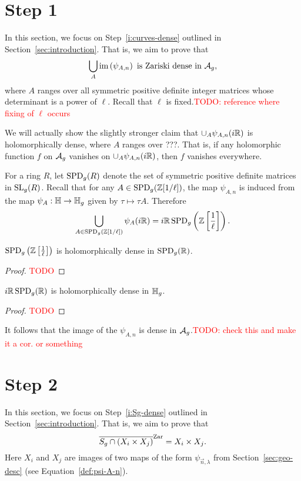 \documentclass{amsart}
\begin{document}
\newpage

\section{Step 1}
\label{sec:step-1}

In this section, we focus on Step~\ref{i:curves-dense} outlined in Section~\ref{sec:introduction}. That is, we aim to prove that
\[
  \bigcup_{A} \operatorname{im}\left(\psi_{A,n}\right) \text{ is Zariski dense in } \mathcal{A}_g,
\]
where $A$ ranges over all symmetric positive definite integer matrices whose determinant is a power of $\ell$. Recall that $\ell$ is fixed.\textcolor{red}{TODO: reference where fixing of $\ell$ occurs}

We will actually show the slightly stronger claim that $\cup_{A} \psi_{A,n}(i\mathbb{R})$ is holomorphically dense, where $A$ ranges over ???. That is, if any holomorphic function $f$ on $\mathcal{A}_g$ vanishes on $\cup_{A} \psi_{A,n}(i\mathbb{R})$, then $f$ vanishes everywhere.

For a ring $R$, let $\operatorname{SPD}_g(R)$ denote the set of symmetric positive definite matrices in $\operatorname{SL}_g(R)$. Recall that for any $A \in \operatorname{SPD}_g(\mathbb{Z}[1/\ell])$, the map $\psi_{A,n}$ is induced from the map $\psi_A: \mathbb{H} \to \mathbb{H}_g$ given by $\tau \mapsto \tau A$. Therefore
\[
  \bigcup_{A \in \operatorname{SPD}_g(\mathbb{Z}[1/\ell])} \psi_A(i\mathbb{R}) = i\mathbb{R}\operatorname{SPD}_g\left(\mathbb{Z}\left[\frac{1}{\ell}\right]\right).
\]

\begin{lemma}
  $\operatorname{SPD}_g\left(\mathbb{Z}\left[\frac{1}{\ell}\right]\right)$ is holomorphically dense in $\operatorname{SPD}_g(\mathbb{R})$.
\end{lemma}
\begin{proof}
  \textcolor{red}{TODO}
\end{proof}

\begin{lemma}
  $i\mathbb{R}\operatorname{SPD}_g(\mathbb{R})$ is holomorphically dense in $\mathbb{H}_g$.
\end{lemma}
\begin{proof}
  \textcolor{red}{TODO}
\end{proof}

It follows that the image of the $\psi_{A,n}$ is dense in $\mathcal{A}_g$.\textcolor{red}{TODO: check this and make it a cor. or something}

\section{Step 2}
\label{sec:step-2}

In this section, we focus on Step~\ref{i:Sg-dense} outlined in Section~\ref{sec:introduction}. That is, we aim to prove that
\[
  \overline{S_g \cap (X_i \times X_j)}^\mathrm{Zar} = X_i \times X_j.
\]
Here $X_i$ and $X_j$ are images of two maps of the form $\psi_{\vec{n},\lambda}$ from Section~\ref{sec:geo-desc} (see Equation~\ref{def:psi-A-n}).
\end{document}
